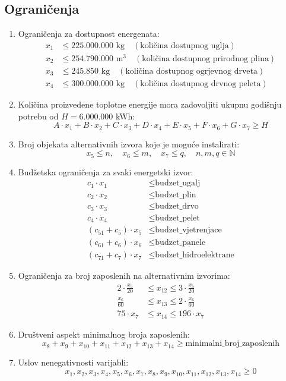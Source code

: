 \documentclass[12pt, a4paper]{paper}
\begin{document}
\subsection*{Ograničenja}
\begin{enumerate}
\item Ograničenja za dostupnost energenata:
\begin{align*}
	x_1 & \leq 225.000.000 \text{ kg} \quad (\text{količina dostupnog uglja}) \\
	x_2 & \leq 254.790.000 \text{ m}^3 \quad (\text{količina dostupnog prirodnog plina}) \\
	x_3 & \leq 245.850 \text{ kg} \quad (\text{količina dostupnog ogrjevnog drveta}) \\
	x_4 & \leq 300.000.000 \text{ kg} \quad (\text{količina dostupnog drvnog peleta})
\end{align*}

	\item Količina proizvedene toplotne energije mora zadovoljiti ukupnu godišnju potrebu od $H = 6.000.000$ kWh:
	\[ A \cdot x_1 + B \cdot x_2 + C \cdot x_3 + D \cdot x_4 + E \cdot x_5 + F \cdot x_6 + G \cdot x_7 \geq H \]
	\item Broj objekata alternativnih izvora koje je moguće instalirati:
	\[x_5 \leq n, \quad x_6 \leq m, \quad x_7 \leq q, \quad n, m, q \in \mathbb{N}\]
	\item Budžetska ograničenja za svaki energetski izvor:
	\begin{align*}
		c_1 \cdot x_1 &\leq \text{budzet\_ugalj} \\
		c_2 \cdot x_2 &\leq \text{budzet\_plin} \\
		c_3 \cdot x_3 &\leq \text{budzet\_drvo} \\
		c_4 \cdot x_4 &\leq \text{budzet\_pelet} \\
		(c_{51}+c_5) \cdot x_5 &\leq \text{budzet\_vjetrenjace} \\
		(c_{61}+c_6) \cdot x_6 &\leq \text{budzet\_panele} \\
		(c_{71}+c_7) \cdot x_7 &\leq \text{budzet\_hidroelektrane}
	\end{align*}
	\item Ograničenja za broj zaposlenih na alternativnim izvorima:
	\begin{align*}
		2 \cdot \frac{x_5}{20} &\leq x_{12} \leq 3 \cdot \frac{x_5}{20} \\
		\frac{x_6}{60} &\leq x_{13} \leq 2 \cdot \frac{x_6}{60} \\
		75 \cdot x_7 &\leq x_{14} \leq 196 \cdot x_7
	\end{align*}
	
	\item Društveni aspekt minimalnog broja zaposlenih:
	\[ x_{8} + x_{9} + x_{10} + x_{11} + x_{12} + x_{13} + x_{14} \geq \text{minimalni\_broj\_zaposlenih} \]
	\item Uslov nenegativnosti varijabli:
	\[ x_1, x_2, x_3, x_4, x_5, x_6, x_7, x_8, x_9, x_{10}, x_{11}, x_{12}, x_{13}, x_{14} \geq 0 \]
\end{enumerate}
\end{document}
